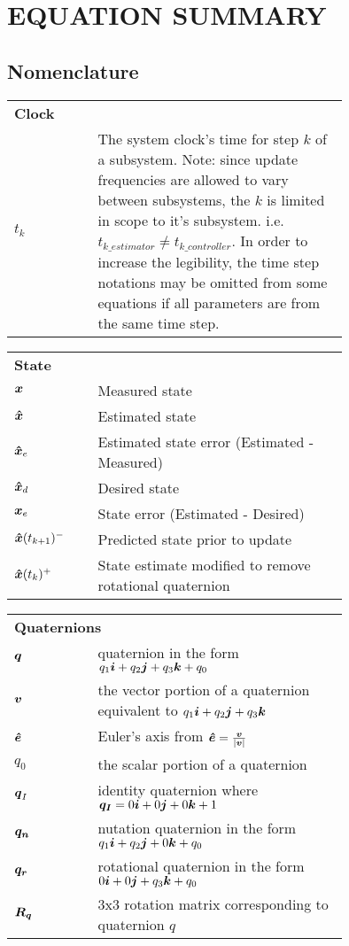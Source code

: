 \chapter{EQUATION SUMMARY}
\label{chap:EquationSummary}

\section{Nomenclature}

\begin{nomenclature}
\begin{tabular}{lp{0.75\linewidth}}
  \multicolumn{2}{l}{\textbf{Clock}} \\
  $t_k$ & The system clock's time for step $k$ of a subsystem.  Note: since update frequencies are allowed to vary between subsystems, the $k$ is limited in scope to it's subsystem.  i.e. $t_{k\_estimator} \ne t_{k\_controller}$.  In order to increase the legibility, the time step notations may be omitted from some equations if all parameters are from the same time step. \\
\end{tabular}

\begin{tabular}{lp{0.75\linewidth}}
  \multicolumn{2}{l}{\textbf{State}} \\
  $\boldsymbol{x}$ & Measured state \\
  $\boldsymbol{\hat{x}}$ & Estimated state \\
  $\boldsymbol{\hat{x}}_e$ & Estimated state error (Estimated - Measured)\\
  $\boldsymbol{\hat{x}}_d$ & Desired state \\
  $\boldsymbol{x}_e$ & State error (Estimated - Desired) \\
  $\boldsymbol{\hat{x}}(t_{k+1})^-$ & Predicted state prior to update \\
  $\boldsymbol{\hat{x}}(t_k)^+$ & State estimate modified to remove rotational quaternion \\
\end{tabular}

\begin{tabular}{lp{0.75\linewidth}}
  \multicolumn{2}{l}{\textbf{Quaternions}} \\
  $\boldsymbol{q}$ & quaternion in the form $q_1\boldsymbol{i}+q_2\boldsymbol{j}+q_3\boldsymbol{k}+q_0$ \\
  $\boldsymbol{v}$ & the vector portion of a quaternion equivalent to $q_1\boldsymbol{i}+q_2\boldsymbol{j}+q_3\boldsymbol{k}$ \\
  $\boldsymbol{\hat{e}}$ & Euler's axis from $\boldsymbol{\hat{e}} = \frac{\boldsymbol{v}}{|\boldsymbol{v}|}$ \\
  $q_0$ & the scalar portion of a quaternion \\
  $\boldsymbol{q}_I$ & identity quaternion where $\boldsymbol{q_I} = 0\boldsymbol{i}+0\boldsymbol{j}+0\boldsymbol{k}+1$ \\
  $\boldsymbol{q_n}$ & nutation quaternion in the form $ q_1 \boldsymbol{i} + q_2 \boldsymbol{j} + 0 \boldsymbol{k} + q_0 $ \\
  $\boldsymbol{q_r}$ & rotational quaternion in the form $ 0 \boldsymbol{i} + 0 \boldsymbol{j} + q_3 \boldsymbol{k} + q_0 $ \\
  $\boldsymbol{R_q}$ & 3x3 rotation matrix corresponding to quaternion $q$ \\
\end{tabular}


\end{nomenclature}
